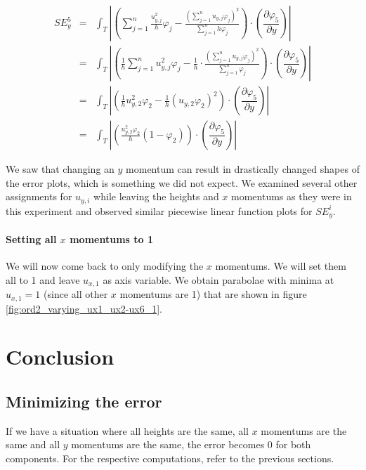 \documentclass{article}
\newcommand{\pd}[2]{\dfrac{\partial #1}{\partial #2}}
\renewcommand{\phi}{\varphi}
\begin{document}
\begin{eqnarray*}
  SE_y^5 & = & \int_T \left| \left( \sum_{j=1}^n \frac{u_{y,j}^2}{h} \phi_j - \frac{\left(\sum_{j=1}^n u_{y,j}\phi_j\right)^2}{\sum_{j=1}^n h\phi_j} \right) \cdot \left(\pd{\phi_5}{y}\right) \right| \\
  {} & = & \int_T \left| \left( \frac{1}{h} \sum_{j=1}^n u_{y,j}^2 \phi_j - \frac{1}{h} \cdot \frac{\left(\sum_{j=1}^n u_{y,j}\phi_j\right)^2}{\sum_{j=1}^n \phi_j} \right) \cdot \left(\pd{\phi_5}{y}\right) \right| \\
{} & = & \int_T \left| \left( \frac{1}{h} u_{y,2}^2 \phi_2 - \frac{1}{h} \left(u_{y,2}\phi_2\right)^2 \right) \cdot \left(\pd{\phi_5}{y}\right) \right| \\
	{} & = & \int_T \left| \left( \frac{u_{y,2}^2 \phi_2}{h} \left( 1 - \phi_2\right) \right) \cdot \left(\pd{\phi_5}{y}\right) \right|
\end{eqnarray*}

We saw that changing an $y$ momentum can result in drastically changed shapes of the error plots,  which is something we did not expect. We examined several other assignments for $u_{y,i}$ while leaving the heights and $x$ momentums as they were in this experiment and observed similar piecewise linear function plots for $SE_y^i$.

\paragraph{Setting all $x$ momentums to 1}

We will now come back to only modifying the $x$ momentums. We will set them all to 1 and leave $u_{x,1}$ as axis variable. We obtain parabolae with minima at $u_{x,1}=1$ (since all other $x$ momentums are 1) that are shown in figure \ref{fig:ord2_varying_ux1_ux2-ux6_1}.




\section{Conclusion}
\label{sec:stiffness-analysis-conclusion}

\subsection{Minimizing the error}
\label{sec:stiffness-analysis-concl-error-0}

If we have a situation where all heights are the same, all $x$ momentums are the same and all $y$ momentums are the same, the error becomes 0 for both components. For the respective computations, refer to the previous sections.
\end{document}
